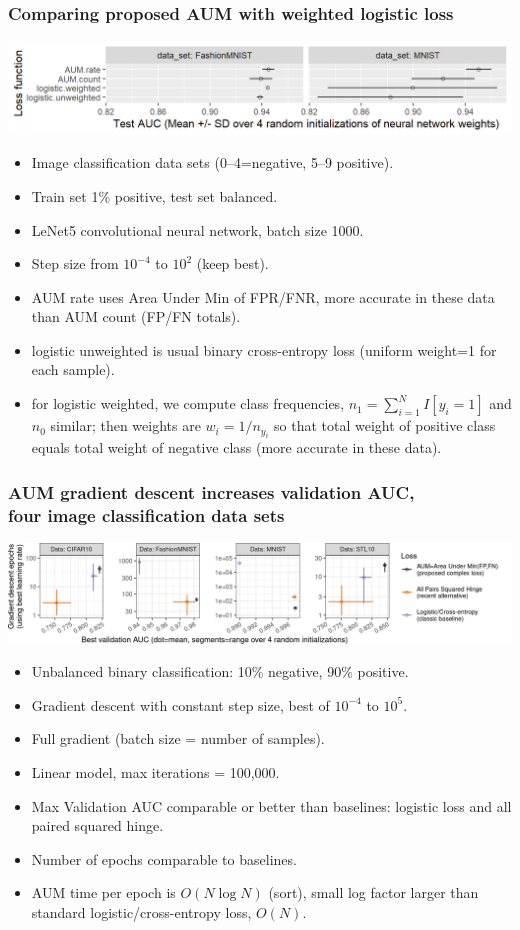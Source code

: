 \documentclass[t]{beamer}
\begin{document}
\begin{frame}
  \frametitle{Comparing proposed AUM with weighted logistic loss}
  \includegraphics[width=\textwidth]{figure-aum-neural-networks-test-auc}
  \begin{itemize}
  \item Image classification data sets (0--4=negative, 5--9 positive).
  \item Train set 1\% positive, test set balanced.
  \item LeNet5 convolutional neural network, batch size 1000.
  \item Step size from $10^{-4}$ to $10^2$ (keep best).
  \item AUM rate uses Area Under Min of FPR/FNR, more accurate in
    these data than AUM count (FP/FN totals).
  \item logistic unweighted is usual binary cross-entropy loss (uniform weight=1 for each sample). 
  \item for logistic weighted, we compute class frequencies, $n_1=\sum_{i=1}^N I[y_i=1]$ and $n_0$ similar; then weights are $w_i=1/n_{y_i}$ so that total weight of positive class equals total weight of negative class (more accurate in these data).
  \end{itemize}
\end{frame}

\begin{frame}
  \frametitle{AUM gradient descent increases validation AUC,\\
    four image classification data sets}
 
\includegraphics[width=\textwidth]{data_Classif_batchtools_best_valid_scatter}

\begin{itemize}
\item Unbalanced binary classification: 10\% negative, 90\% positive.
\item Gradient descent with constant step size, best of $10^{-4}$ to $10^5$.
\item Full gradient (batch size = number of samples).
\item Linear model, max iterations = 100,000.
\item Max Validation AUC comparable or better than baselines: logistic loss and all paired squared hinge.
\item Number of epochs comparable to baselines.
\item AUM time per epoch is $O(N \log N)$ (sort), small log factor larger than standard logistic/cross-entropy loss, $O(N)$.
\end{itemize}

\end{frame}
\end{document}
